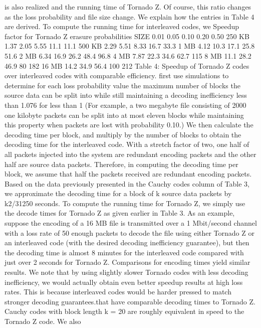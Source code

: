 \documentclass[12pt,a4paper,titlepage,twocolumn]{article}
\begin{document}
is also realized and the running time of Tornado Z. Of
course, this ratio changes as the loss probability and file
size change.
We explain how the entries in Table 4 are derived.
To compute the running time for interleaved codes, we
Speedup factor for Tornado Z
erasure probabilities
SIZE 0.01 0.05 0.10 0.20 0.50
250 KB 1.37 2.05 5.55 11.1 11.1
500 KB 2.29 5.51 8.33 16.7 33.3
1 MB 4.12 10.3 17.1 25.8 51.6
2 MB 6.34 16.9 26.2 48.4 96.8
4 MB 7.87 22.3 34.6 62.7 115
8 MB 11.1 28.2 46.9 80 182
16 MB 14.2 34.9 56.4 100 212
Table 4: Speedup of Tornado Z codes over interleaved
codes with comparable efficiency.
first use simulations to determine for each loss probability
value the maximum number of blocks the source
data can be split into while still maintaining a decoding
inefficiency less than 1.076 for less than 1%
(For example, a two megabyte file consisting of 2000 one
kilobyte packets can be split into at most eleven blocks
while maintaining this property when packets are lost
with probability 0.10.) We then calculate the decoding
time per block, and multiply by the number of blocks
to obtain the decoding time for the interleaved code.
With a stretch factor of two, one half of all packets injected
into the system are redundant encoding packets
and the other half are source data packets. Therefore,
in computing the decoding time per block, we assume
that half the packets received are redundant encoding
packets. Based on the data previously presented in the
Cauchy codes column of Table 3, we approximate the
decoding time for a block of k source data packets by
k2/31250 seconds. To compute the running time for
Tornado Z, we simply use the decode times for Tornado
Z as given earlier in Table 3.
As an example, suppose the encoding of a 16 MB
file is transmitted over a 1 Mbit/second channel with a
loss rate of 50%
enough packets to decode the file using either Tornado Z
or an interleaved code (with the desired decoding inefficiency
guarantee), but then the decoding time is almost
8 minutes for the interleaved code compared with just
over 2 seconds for Tornado Z. Comparisons for encoding
times yield similar results. We note that by using
slightly slower Tornado codes with less decoding inefficiency,
we would actually obtain even better speedup
results at high loss rates. This is because interleaved
codes would be harder pressed to match stronger decoding
guarantees.that have comparable decoding times to Tornado Z.
Cauchy codes with block length k = 20 are roughly
equivalent in speed to the Tornado Z code. We also
\end{document}
